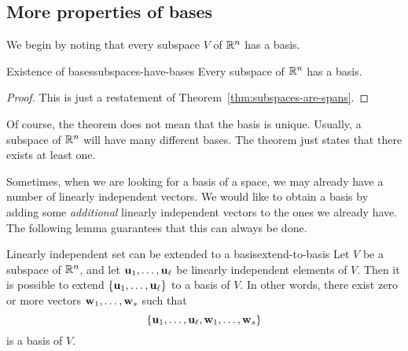 \subsection{More properties of bases}

We begin by noting that every subspace $V$ of $\mathbb{R}^n$ has a basis.

\begin{theorem}{Existence of bases}{subspaces-have-bases}
  Every subspace of $\mathbb{R}^n$ has a basis. 
\end{theorem}

\begin{proof}
  This is just a restatement of Theorem~\ref{thm:subspaces-are-spans}.
\end{proof}

Of course, the theorem does not mean that the basis is
unique. Usually, a subspace of $\mathbb{R}^n$ will have many different
bases. The theorem just states that there exists at least one.

Sometimes, when we are looking for a basis of a space, we may already
have a number of linearly independent vectors. We would like to obtain
a basis by adding some {\em additional} linearly independent vectors
to the ones we already have. The following lemma guarantees that this
can always be done.

\begin{lemma}{Linearly independent set can be extended to a basis}{extend-to-basis}
  Let $V$ be a subspace of $\mathbb{R}^n$, and let
  $\mbox{\bf u}_1,\ldots,\mbox{\bf u}_{\ell}$ be linearly independent elements
  of $V$. Then it is possible to extend
  $\left\{\mbox{\bf u}_1,\ldots,\mbox{\bf u}_{\ell}\right\}$ to a basis of $V$. In other
  words, there exist zero or more vectors
  $\mbox{\bf w}_1,\ldots,\mbox{\bf w}_s$ such that
  \begin{equation*}
    \left\{\mbox{\bf u}_1,\ldots,\mbox{\bf u}_{\ell},\mbox{\bf w}_1,\ldots,\mbox{\bf w}_s\right\}
  \end{equation*}
  is a basis of $V$.
\end{lemma}

